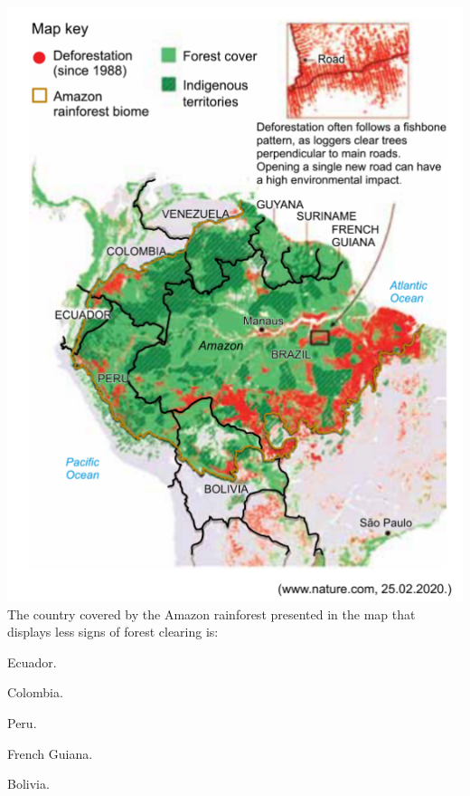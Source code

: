 \questao
\includegraphics[width=\columnwidth]{subareas/linguagens/ingles-2.png}
The country covered by the Amazon rainforest presented in the map that displays less signs of forest clearing is:
\begin{alternativas}
  \item Ecuador.
  \item Colombia.
  \item Peru.
  \item French Guiana.
  \item Bolivia.
\end{alternativas}



